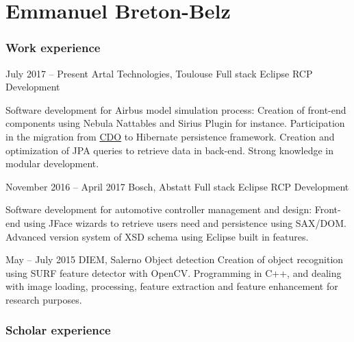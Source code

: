 \documentclass{tccv-master/tccv}
\begin{document}
\part{Emmanuel Breton-Belz}

\section{Work experience}

\begin{eventlist}

\item{July 2017 -- Present}
     {Artal Technologies, Toulouse}
     {Full stack Eclipse RCP Development}

Software development for Airbus model simulation process: Creation of 
front-end components using Nebula Nattables and Sirius Plugin for instance.
Participation in the migration from \href{https://www.eclipse.org/cdo/}{CDO} to Hibernate
persistence framework. Creation and optimization of JPA queries to retrieve 
data in back-end. Strong knowledge in modular development.

\item{November 2016 -- April 2017}
     {Bosch, Abstatt}
     {Full stack Eclipse RCP Development}

Software development for automotive controller management and design:
Front-end using JFace wizards to retrieve users need and persistence using 
SAX/DOM. Advanced version system of XSD schema using Eclipse built in
features.

\item{May -- July 2015}
     {DIEM, Salerno}
     {Object detection}
Creation of object recognition using SURF feature detector with OpenCV.
Programming in C++, and dealing with image loading, processing, feature extraction
and feature enhancement for research purposes.

\end{eventlist}

\section{Scholar experience}
\end{document}
